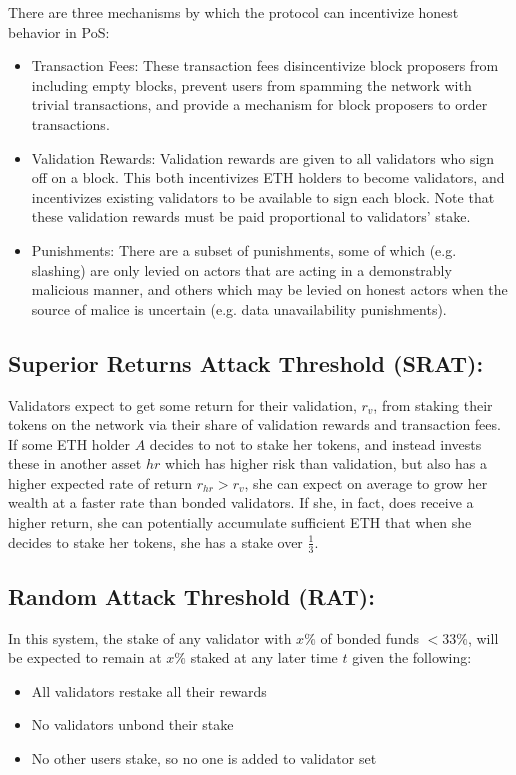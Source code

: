 \documentclass{article}
\renewcommand{\|}{\;|\;}
\begin{document}
There are three mechanisms by which the protocol can incentivize honest behavior in PoS:
\begin{itemize}
    \item Transaction Fees: These transaction fees disincentivize block proposers from including empty blocks, prevent users from spamming the network with trivial transactions, and provide a mechanism for block proposers to order transactions.
    \item Validation Rewards: Validation rewards are given to all validators who sign off on a block. This both incentivizes ETH holders to become validators, and incentivizes existing validators to be available to sign each block. Note that these validation rewards must be paid proportional to validators' stake.
    \item Punishments: There are a subset of punishments, some of which (e.g. slashing) are only levied on actors that are acting in a demonstrably malicious manner, and others which may be levied on honest actors when the source of malice is uncertain (e.g. data unavailability punishments).
\end{itemize}

\subsection*{Superior Returns Attack Threshold (SRAT):}
Validators expect to get some return for their validation, $r_{v}$, from staking their tokens on the network via their share of validation rewards and transaction fees. If some ETH holder ${A}$ decides to not to stake her tokens, and instead invests these in another asset $hr$ which has higher risk than validation, but also has a higher expected rate of return $r_{hr} > r_{v}$, she can expect on average to grow her wealth at a faster rate than bonded validators. If she, in fact, does receive a higher return, she can potentially accumulate sufficient ETH that when she decides to stake her tokens, she has a stake over $\frac{1}{3}$.

\subsection*{Random Attack Threshold (RAT):}
In this system, the stake of any validator with $x\%$ of bonded funds $< 33\%$, will be expected to remain at $x\%$ staked at any later time ${t}$ given the following: 
\begin{itemize}
  \item All validators restake all their rewards
  \item No validators unbond their stake
  \item No other users stake, so no one is added to validator set
\end{itemize}
\end{document}
